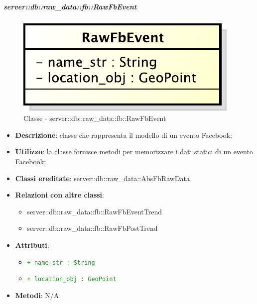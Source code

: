 			\subparagraph{server::db::raw\_data::fb::RawFbEvent} %
			\label{subp:server_db_raw_data_fb_rawfbevent}
				\begin{figure}[htbp]
					\centering
					\centerline{\includegraphics[scale=0.75]{./images/server/classes/db/raw_fb_event.pdf}}
					\caption{Classe - server::db::raw\_data::fb::RawFbEvent}
				\end{figure}
				\begin{itemize}
					\item \textbf{Descrizione}: classe che rappresenta il modello di un evento Facebook;
					\item \textbf{Utilizzo}: la classe fornisce metodi per memorizzare i dati statici di un evento Facebook;
					\item \textbf{Classi ereditate}: server::db::raw\_data::AbsFbRawData
					\item \textbf{Relazioni con altre classi}:
						\begin{itemize}
							\item server::db::raw\_data::fb::RawFbEventTrend
							\item server::db::raw\_data::fb::RawFbPostTrend
						\end{itemize}
					\item \textbf{Attributi}:
					\begin{itemize}
						\item \textcolor{forestgreen}{\texttt{+ name\_str : String}}
						\item \textcolor{forestgreen}{\texttt{+ location\_obj : GeoPoint}}
					\end{itemize}
					\item \textbf{Metodi}: N/A
				\end{itemize}

